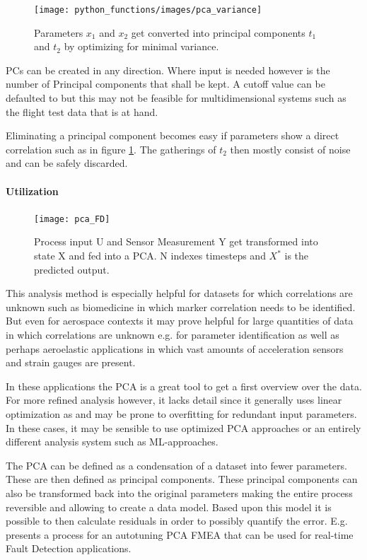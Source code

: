 \begin{figure}[h]
    \centering
    \texttt{[image: python\_functions/images/pca\_variance]}
    \caption{Parameters $x_1$ and $x_2$ get converted into principal components $t_1$ and $t_2$ by optimizing for minimal variance.}
    \label{fig:pca_variance}
\end{figure}

PCs can be created in any direction. Where input is needed however is the number of Principal components that shall be kept. A cutoff value can be defaulted to but this may not be feasible for multidimensional systems such as the flight test data that is at hand.


Eliminating a principal component becomes easy if parameters show a direct correlation such as in figure \ref{fig:pca_variance}. The gatherings of $t_2$ then mostly consist of noise and can be safely discarded.

\paragraph{Utilization}
\par
\begin{figure}
    \vspace{-20pt}
    \centering
    \texttt{[image: pca\_FD]}
    \caption{Process input U and Sensor Measurement Y get transformed into state X and fed into a PCA. N indexes timesteps and $X^*$ is the predicted output.\cite[p.268]{isermann_fault-diagnosis_2006}}
    \label{fig:pca_FD}
\end{figure}

This analysis method is especially helpful for datasets for which correlations are unknown such as biomedicine in which marker correlation needs to be identified. But even for aerospace contexts it may prove helpful for large quantities of data in which correlations are unknown e.g. for parameter identification as well as perhaps aeroelastic applications in which vast amounts of acceleration sensors and strain gauges are present.

In these applications the PCA is a great tool to get a first overview over the data. For more refined analysis however, it lacks detail since it generally uses linear optimization as and may be prone to overfitting for redundant input parameters. In these cases, it may be sensible to use optimized PCA approaches or an entirely different analysis system such as ML-approaches.

The PCA can be defined as a condensation of a dataset into fewer parameters. These are then defined as principal components. These principal components can also be transformed back into the original parameters making the entire process reversible and allowing to create a data model. Based upon this model it is possible to then calculate residuals in order to possibly quantify the error. E.g. \textcite{isermann_fault-diagnosis_2006} presents a process for an autotuning PCA FMEA that can be used for real-time Fault Detection applications.


